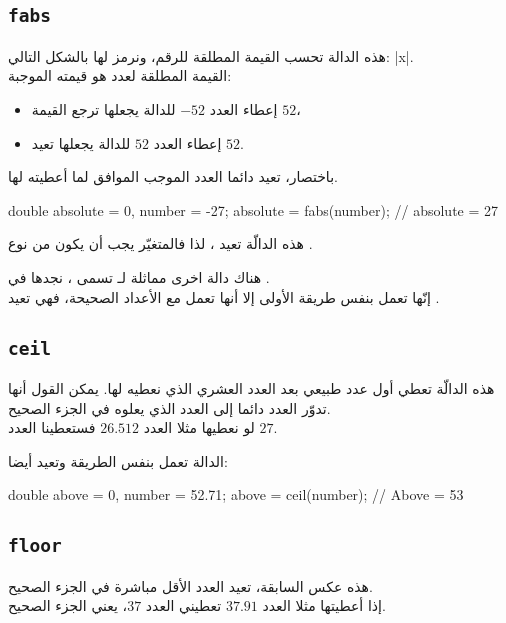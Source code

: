 \subsection{\texttt{fabs}}

هذه الدالة تحسب القيمة المطلقة للرقم، ونرمز لها بالشكل التالي:
\textenglish{|x|}.\\
القيمة المطلقة لعدد هو قيمته الموجبة:

\begin{itemize}
  \item إعطاء العدد $ -52 $ للدالة يجعلها ترجع القيمة $ 52 $،
  \item إعطاء العدد $ 52 $ للدالة يجعلها تعيد $ 52 $.
\end{itemize}

باختصار، تعيد دائما العدد الموجب الموافق لما أعطيته لها.

\begin{Console}
double absolute = 0, number = -27;
absolute = fabs(number); // absolute = 27
\end{Console}

هذه الدالّة تعيد
،
لذا فالمتغيّر
يجب أن يكون من نوع
.

\begin{information}
هناك دالة اخرى مماثلة لـ
تسمى
،
نجدها في
.\\
إنّها تعمل بنفس طريقة الأولى إلا أنها تعمل مع الأعداد الصحيحة، فهي تعيد
.
\end{information}

\subsection{\texttt{ceil}}

هذه الدالّة تعطي أول عدد طبيعي بعد العدد العشري الذي نعطيه لها. يمكن القول أنها تدوّر العدد دائما إلى العدد الذي يعلوه في الجزء الصحيح.\\
لو نعطيها مثلا العدد $ 26.512 $ فستعطينا العدد $ 27 $.

الدالة تعمل بنفس الطريقة وتعيد
أيضا:

\begin{Csource}
double above = 0, number = 52.71;
above = ceil(number); // Above = 53
\end{Csource}

\subsection{\texttt{floor}}
هذه عكس السابقة، تعيد العدد الأقل مباشرة في الجزء الصحيح.\\
إذا أعطيتها مثلا العدد $ 37.91 $ تعطيني العدد $ 37 $، يعني الجزء الصحيح.

